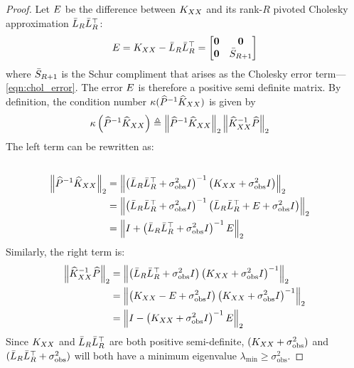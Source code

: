 \begin{proof}
  Let $E$ be the difference between $K_{XX}$ and its rank-$R$ pivoted Cholesky approximation $\bar{L}_R \bar{L}_R^\top$:
  \[
    E = K_{XX} - \bar{L}_R \bar{L}_R^\top = \begin{bmatrix} \mathbf{0} & \mathbf{0} \\ \mathbf{0} & \bar {S}_{R+1} \end{bmatrix}
  \]
  where $\bar {S}_{R+1}$ is the Schur compliment that arises as the Cholesky error term---\cref{eqn:chol_error}.
  The error $E$ is therefore a positive semi definite matrix.
  By definition, the condition number $\kappa ( \widehat{P}^{-1}\widehat{K}_{XX} )$ is given by
  \begin{align*}
    \kappa \left( \widehat{P}^{-1}\widehat{K}_{XX} \right)
    &\triangleq \left\Vert \widehat{P}^{-1}\widehat{K}_{XX} \right\Vert_{2} \left\Vert \widehat{K}_{XX}^{-1}\widehat{P} \right\Vert_{2}
  \end{align*}
  The left term can be rewritten as:
  \begin{align*}
    \\
    \left\Vert \widehat{P}^{-1}\widehat{K}_{XX} \right\Vert_{2}
    &= \left\Vert \left( \bar{L}_R \bar{L}_R^\top + \sigma^2_\text{obs} I \right)^{-1} \left(K_{XX} + \sigma^2_\text{obs} I \right) \right\Vert_{2}
    \\
    &= \left\Vert \left( \bar{L}_R \bar{L}_R^\top + \sigma^2_\text{obs} I \right)^{-1} \left(\bar{L}_R \bar{L}_R^\top + E + \sigma^2_\text{obs} I \right) \right\Vert_{2}
    \\
    &= \left\Vert I + \left( \bar{L}_R \bar{L}_R^\top + \sigma^2_\text{obs} I \right)^{-1} E \right\Vert_{2}
  \end{align*}
  Similarly, the right term is:
  \begin{align*}
    \left\Vert \widehat{K}_{XX}^{-1}\widehat{P} \right\Vert_{2}
    &= \left\Vert \left( \bar{L}_R \bar{L}_R^\top + \sigma^2_\text{obs} I \right) \left(K_{XX} + \sigma^2_\text{obs} I \right)^{-1} \right\Vert_{2}
    \\
    &= \left\Vert \left( K_{XX} - E + \sigma^2_\text{obs} I \right) \left(K_{XX} + \sigma^2_\text{obs} I \right)^{-1} \right\Vert_{2}
    \\
    &= \left\Vert I - \left(K_{XX} + \sigma^2_\text{obs} I \right)^{-1} E \right\Vert_{2}
  \end{align*}
  Since $K_{XX}$ and $\bar{L}_R \bar{L}_R^\top$ are both positive semi-definite,
  $(K_{XX} + \sigma^2_\text{obs})$ and $(\bar{L}_R \bar{L}_R^\top + \sigma^2_\text{obs})$ will both have a minimum eigenvalue $\lambda_\text{min} \geq \sigma^2_\text{obs}$.

\end{proof}

